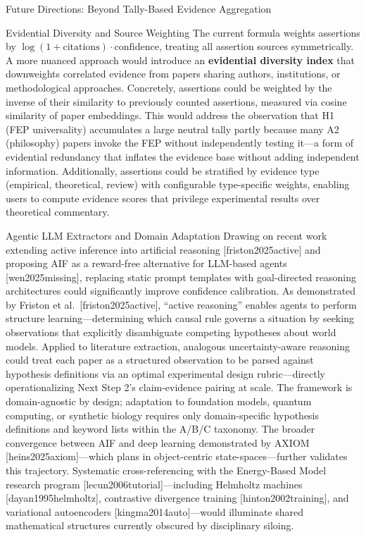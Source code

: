 \documentclass[
  ignorenonframetext,
]{beamer}
\providecommand{\citep}[1]{[#1]}
\begin{document}
\begin{frame}[allowframebreaks]{Future Directions: Beyond Tally-Based
Evidence Aggregation}
\begin{block}{Evidential Diversity and Source Weighting}
\protect{}\label{evidential-diversity-and-source-weighting}
The current formula weights assertions by
\(\log(1 + \text{citations}) \cdot \text{confidence}\), treating all
assertion sources symmetrically. A more nuanced approach would introduce
an \textbf{evidential diversity index} that downweights correlated
evidence from papers sharing authors, institutions, or methodological
approaches. Concretely, assertions could be weighted by the inverse of
their similarity to previously counted assertions, measured via cosine
similarity of paper embeddings. This would address the observation that
H1 (FEP universality) accumulates a large neutral tally partly because
many A2 (philosophy) papers invoke the FEP without independently testing
it---a form of evidential redundancy that inflates the evidence base
without adding independent information. Additionally, assertions could
be stratified by evidence type (empirical, theoretical, review) with
configurable type-specific weights, enabling users to compute evidence
scores that privilege experimental results over theoretical commentary.
\end{block}

\begin{block}{Agentic LLM Extractors and Domain Adaptation}
\protect{}\label{agentic-llm-extractors-and-domain-adaptation}
Drawing on recent work extending active inference into artificial
reasoning \citep{friston2025active} and proposing AIF as a reward-free
alternative for LLM-based agents \citep{wen2025missing}, replacing
static prompt templates with goal-directed reasoning architectures could
significantly improve confidence calibration. As demonstrated by Friston
et al.~\citep{friston2025active}, ``active reasoning'' enables agents to
perform structure learning---determining which causal rule governs a
situation by seeking observations that explicitly disambiguate competing
hypotheses about world models. Applied to literature extraction,
analogous uncertainty-aware reasoning could treat each paper as a
structured observation to be parsed against hypothesis definitions via
an optimal experimental design rubric---directly operationalizing Next
Step 2's claim-evidence pairing at scale. The framework is
domain-agnostic by design; adaptation to foundation models, quantum
computing, or synthetic biology requires only domain-specific hypothesis
definitions and keyword lists within the A/B/C taxonomy. The broader
convergence between AIF and deep learning demonstrated by AXIOM
\citep{heins2025axiom}---which plans in object-centric
state-spaces---further validates this trajectory. Systematic
cross-referencing with the Energy-Based Model research program
\citep{lecun2006tutorial}---including Helmholtz machines
\citep{dayan1995helmholtz}, contrastive divergence training
\citep{hinton2002training}, and variational autoencoders
\citep{kingma2014auto}---would illuminate shared mathematical structures
currently obscured by disciplinary siloing.
\end{block}
\end{frame}
\end{document}
